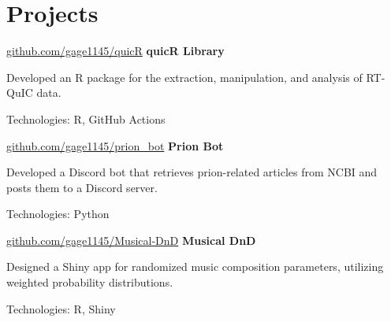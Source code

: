 \documentclass{resume}
\begin{document}
    
    \section{Projects}

        \begin{software}{\href{https://github.com/gage1145/quicR}{github.com/gage1145/quicR}}
            \textbf{quicR Library}
        \end{software}
        \begin{highlights}
            \item Developed an R package for the extraction, manipulation, and analysis of RT-QuIC data.
            \item Technologies: R, GitHub Actions
        \end{highlights}

        \begin{software}{\href{https://github.com/gage1145/prion_bot}{github.com/gage1145/prion\_bot}}
            \textbf{Prion Bot}
        \end{software}
        \begin{highlights}
            \item Developed a Discord bot that retrieves prion-related articles from NCBI and posts them to a Discord server.
            \item Technologies: Python
        \end{highlights}

        \begin{software}{\href{https://github.com/gage1145/Musical-DnD}{github.com/gage1145/Musical-DnD}}
            \textbf{Musical DnD}
        \end{software}
        \begin{highlights}
            \item Designed a Shiny app for randomized music composition parameters, utilizing weighted probability distributions.
            \item Technologies: R, Shiny
        \end{highlights}



\end{document}
